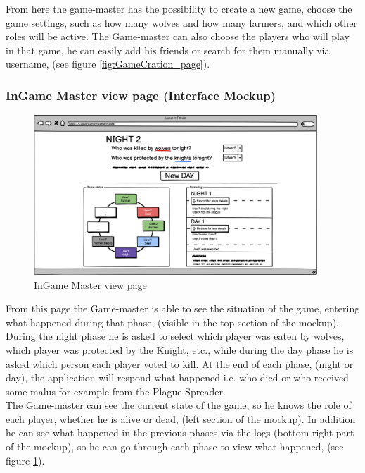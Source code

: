 From here the game-master has the possibility to create a new game, choose the game settings, such as how many wolves and how many farmers, and which other roles will be active. The Game-master can also choose the players who will play in that game, he can easily add his friends or search for them manually via username, (see figure \ref{fig:GameCration_page}).

\subsubsection{InGame Master view page (Interface Mockup)}
\begin{figure}[htb] 
    \centering
    \includegraphics[height=6cm]{images/Page/Gamemaster.png}
    \caption{InGame Master view page}
    \label{fig:Gamemaster_page}
\end{figure}

From this page the Game-master is able to see the situation of the game, entering what happened during that phase, (visible in the top section of the mockup). During the night phase he is asked to select which player was eaten by wolves, which player was protected by the Knight, etc., while during the day phase he is asked which person each player voted to kill. At the end of each phase, (night or day), the application will respond what happened i.e. who died or who received some malus for example from the Plague Spreader.\\
The Game-master can see the current state of the game, so he knows the role of each player, whether he is alive or dead, (left section of the mockup). In addition he can see what happened in the previous phases via the logs (bottom right part of the mockup), so he can go through each phase to view what happened, (see figure \ref{fig:Gamemaster_page}).


